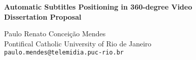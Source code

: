 \documentclass[11pt]{article}
\begin{document}
\LARGE


\begin{center}
{\bf Automatic Subtitles Positioning in 360-degree Video
\Large
\\Dissertation Proposal}
\end{center}


\bigskip
\normalsize

\begin{flushright}

Paulo Renato Conceição Mendes\\
Pontifical Catholic University of Rio de Janeiro\\
\texttt{paulo.mendes@telemidia.puc-rio.br}
\end{flushright}


\date{}


\thispagestyle{empty}

%
%

{} \setcounter{page}{-1}

\tableofcontents

\newpage
{} \setcounter{page}{1}







\newpage

% 

\end{document}
